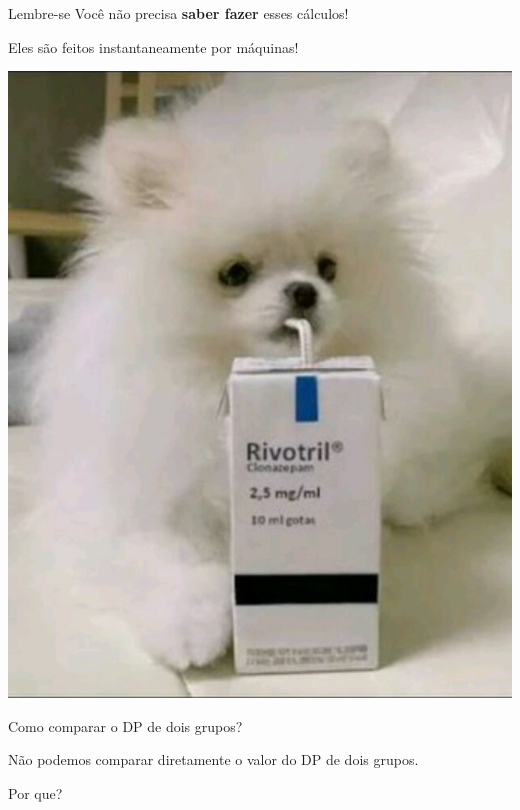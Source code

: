 \documentclass{beamer}
\begin{document}
\begin{frame}{\scriptsize}
  \begin{block}{Lembre-se}
    \footnotesize
    Você não precisa {\bf saber fazer} esses cálculos!

    \bigskip
    Eles são feitos instantaneamente por máquinas!
  \end{block}
  \bigskip
  \vfill
  \begin{center}
    \includegraphics[height=.5\textheight]{Cap3/rivis}
  \end{center}
\end{frame}


\begin{frame}{\scriptsize Como comparar o DP de dois grupos?}
  \begin{block}{}
    \footnotesize
    Não podemos comparar diretamente o \alert{valor} do DP de dois grupos.

    \bigskip
    Por que?
  \end{block}
\end{frame}
\end{document}
